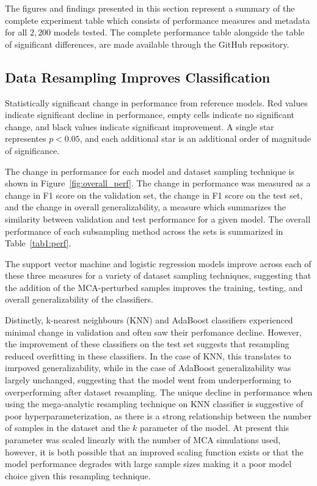 \documentclass[10pt]{SelfArx} %
\begin{document}
The figures and findings presented in this section represent a summary of the complete experiment table which consists
of performance measures and metadata for all $2,200$ models tested. The complete performance table alongside the table
of significant differences, are made available through the GitHub repository.

\subsection*{Data Resampling Improves Classification}

\begin{table}[tbh]
\centering
\caption{Statistically significant change in performance from reference models. Red values indicate significant
decline in performance, empty cells indicate no significant change, and black values indicate significant improvement.
A single star representes $p < 0.05$, and each additional star is an additional order of magnitude of significance.}
\label{tab1:perf}
\small

\end{table}

The change in performance for each model and dataset sampling technique is shown in Figure~\ref{fig:overall_perf}. The
change in performance was measured as a change in F1 score on the validation set, the change in F1 score on the test
set, and the change in overall generalizability, a measure which summarizes the similarity between validation and test
performance for a given model. The overall performance of each subsampling method across the sets is summarized in
Table~\ref{tab1:perf}.

The support vector machine and logistic regression models improve across each of these three measures for a variety of
dataset sampling techniques, suggesting that the addition of the MCA-perturbed samples improves the training, testing,
and overall generalizability of the classifiers.

Distinctly, k-nearest neighbours (KNN) and AdaBoost classifiers experienced minimal change in validation and often saw
their perfomance decline. However, the improvement of these classifiers on the test set suggests that resampling
reduced overfitting in these classifiers. In the case of KNN, this translates to imrpoved generalizability, while in
the case of AdaBoost generalizability was largely unchanged, suggesting that the model went from underperforming to
overperforming after dataset resampling. The unique decline in performance when using the mega-analytic resampling
technique on KNN classifier is suggestive of poor hyperparameterization, as there is a strong relationship between the
number of samples in the dataset and the $k$ parameter of the model. At present this parameter was scaled linearly with
the number of MCA simulations used, however, it is both possible that an improved scaling function exists or that the
model performance degrades with large sample sizes making it a poor model choice given this resampling technique.
\end{document}
